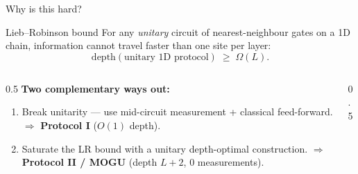 \documentclass[aspectratio=169,10pt]{beamer}
\begin{document}
\begin{frame}{Why is this hard?}
  \begin{block}{Lieb--Robinson bound}
    For any \emph{unitary} circuit of nearest-neighbour gates on a 1D chain,
    information cannot travel faster than one site per layer:
    \[
      \text{depth}(\text{unitary 1D protocol}) \;\geq\; \Omega(L).
    \]
  \end{block}

  \begin{columns}[T,onlytextwidth]
    \begin{column}{0.5\textwidth}
      \footnotesize
      \textbf{Two complementary ways out:}
      \begin{enumerate}\setlength{\itemsep}{0.2em}
        \item \alert{Break unitarity} — use mid-circuit measurement +
              classical feed-forward.
              $\Rightarrow$ \textbf{Protocol I} ($O(1)$ depth).
        \item \alert{Saturate the LR bound} with a unitary depth-optimal construction.
              $\Rightarrow$ \textbf{Protocol II / MOGU} (depth $L+2$, $0$ measurements).
      \end{enumerate}
    \end{column}
    \begin{column}{0.5\textwidth}
      \centering
    \end{column}
  \end{columns}
\end{frame}
\end{document}
